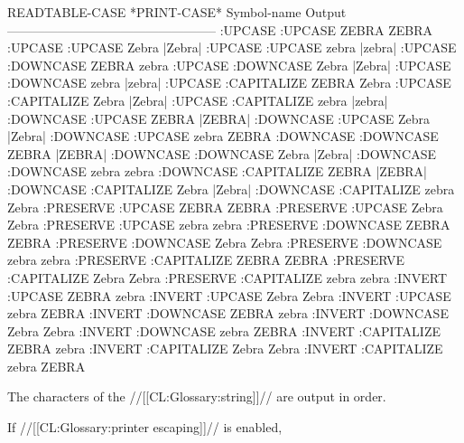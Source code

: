\code
    READTABLE-CASE *PRINT-CASE*  Symbol-name  Output
    --------------------------------------------------
    :UPCASE        :UPCASE       ZEBRA        ZEBRA
    :UPCASE        :UPCASE       Zebra        |Zebra|
    :UPCASE        :UPCASE       zebra        |zebra|
    :UPCASE        :DOWNCASE     ZEBRA        zebra
    :UPCASE        :DOWNCASE     Zebra        |Zebra|
    :UPCASE        :DOWNCASE     zebra        |zebra|
    :UPCASE        :CAPITALIZE   ZEBRA        Zebra
    :UPCASE        :CAPITALIZE   Zebra        |Zebra|
    :UPCASE        :CAPITALIZE   zebra        |zebra|
    :DOWNCASE      :UPCASE       ZEBRA        |ZEBRA|
    :DOWNCASE      :UPCASE       Zebra        |Zebra|
    :DOWNCASE      :UPCASE       zebra        ZEBRA
    :DOWNCASE      :DOWNCASE     ZEBRA        |ZEBRA|
    :DOWNCASE      :DOWNCASE     Zebra        |Zebra|
    :DOWNCASE      :DOWNCASE     zebra        zebra
    :DOWNCASE      :CAPITALIZE   ZEBRA        |ZEBRA|
    :DOWNCASE      :CAPITALIZE   Zebra        |Zebra|
    :DOWNCASE      :CAPITALIZE   zebra        Zebra
    :PRESERVE      :UPCASE       ZEBRA        ZEBRA
    :PRESERVE      :UPCASE       Zebra        Zebra
    :PRESERVE      :UPCASE       zebra        zebra
    :PRESERVE      :DOWNCASE     ZEBRA        ZEBRA
    :PRESERVE      :DOWNCASE     Zebra        Zebra
    :PRESERVE      :DOWNCASE     zebra        zebra
    :PRESERVE      :CAPITALIZE   ZEBRA        ZEBRA
    :PRESERVE      :CAPITALIZE   Zebra        Zebra
    :PRESERVE      :CAPITALIZE   zebra        zebra
    :INVERT        :UPCASE       ZEBRA        zebra
    :INVERT        :UPCASE       Zebra        Zebra
    :INVERT        :UPCASE       zebra        ZEBRA
    :INVERT        :DOWNCASE     ZEBRA        zebra
    :INVERT        :DOWNCASE     Zebra        Zebra
    :INVERT        :DOWNCASE     zebra        ZEBRA
    :INVERT        :CAPITALIZE   ZEBRA        zebra
    :INVERT        :CAPITALIZE   Zebra        Zebra
    :INVERT        :CAPITALIZE   zebra        ZEBRA
\endcode

\endsubsubsubsubsection%

\endsubsubsubsection%

\endsubsubsection%


The characters of the //[[CL:Glossary:string]]// are output in order.

If //[[CL:Glossary:printer escaping]]// is enabled,

